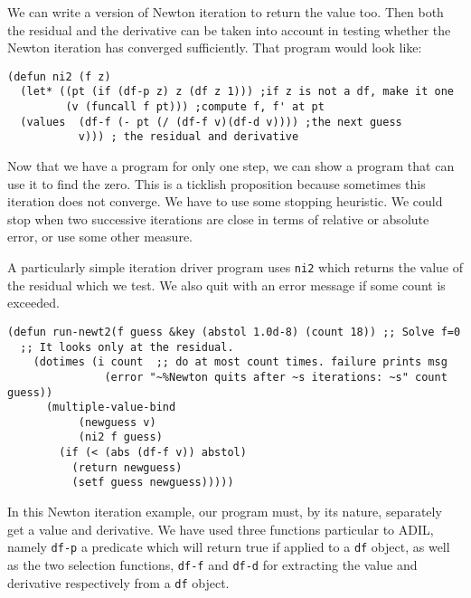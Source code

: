 \documentclass{article}
\begin{document}
{{{We can write a version of Newton iteration to return the value too.
Then both the residual and the derivative can be taken into account in
testing whether the Newton iteration has converged sufficiently.  That
program would look like:
\begin{verbatim}
(defun ni2 (f z)
  (let* ((pt (if (df-p z) z (df z 1))) ;if z is not a df, make it one
         (v (funcall f pt))) ;compute f, f' at pt
  (values  (df-f (- pt (/ (df-f v)(df-d v)))) ;the next guess
           v))) ; the residual and derivative
\end{verbatim}
%
Now that we have a program for only one step, we can show a program
that can use it to find the zero. This is a ticklish proposition
because sometimes this iteration does not converge. We have to use
some stopping heuristic.  We could stop when two successive iterations
are close in terms of relative or absolute error, or use some other
measure.

A particularly simple iteration driver program uses {\tt ni2} which
returns the value of the residual which we test. We also
quit with an error message if some count is exceeded.

\begin{verbatim}
(defun run-newt2(f guess &key (abstol 1.0d-8) (count 18)) ;; Solve f=0
  ;; It looks only at the residual.
    (dotimes (i count  ;; do at most count times. failure prints msg
               (error "~%Newton quits after ~s iterations: ~s" count guess))
      (multiple-value-bind
           (newguess v)
           (ni2 f guess)
        (if (< (abs (df-f v)) abstol) 
          (return newguess)
          (setf guess newguess)))))
\end{verbatim}

In this Newton iteration example, our program must, by its nature,
separately get a value and derivative.  We have used three
functions particular to ADIL, namely {\tt df-p} a predicate which will
return true if applied to a {\tt df} object, as well as the two
selection functions, {\tt df-f} and {\tt df-d} for extracting the
value and derivative respectively from a {\tt df} object.

}}}
\end{document}
